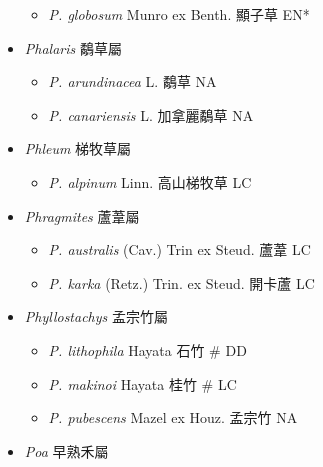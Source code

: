 \begin{itemize}
  \begin{itemize}
        \item[] \textit{P. globosum} Munro ex Benth.  顯子草   EN*
  \end{itemize}
 \item[] \textit{Phalaris} 鷸草屬
                                
  \begin{itemize}
        \item[] \textit{P. arundinacea} L.  鷸草   NA
        \item[] \textit{P. canariensis} L.  加拿麗鷸草   NA
  \end{itemize}
 \item[] \textit{Phleum} 梯牧草屬
                                
  \begin{itemize}
        \item[] \textit{P. alpinum} Linn.  高山梯牧草   LC
  \end{itemize}
 \item[] \textit{Phragmites} 蘆葦屬
                                
  \begin{itemize}
        \item[] \textit{P. australis} (Cav.) Trin ex Steud.  蘆葦   LC
        \item[] \textit{P. karka} (Retz.) Trin. ex Steud.  開卡蘆   LC
  \end{itemize}
 \item[] \textit{Phyllostachys} 孟宗竹屬
                                
  \begin{itemize}
        \item[] \textit{P. lithophila} Hayata  石竹  \# DD
        \item[] \textit{P. makinoi} Hayata  桂竹  \# LC
        \item[] \textit{P. pubescens} Mazel ex Houz.  孟宗竹   NA
  \end{itemize}
 \item[] \textit{Poa} 早熟禾屬
                                

\end{itemize}
